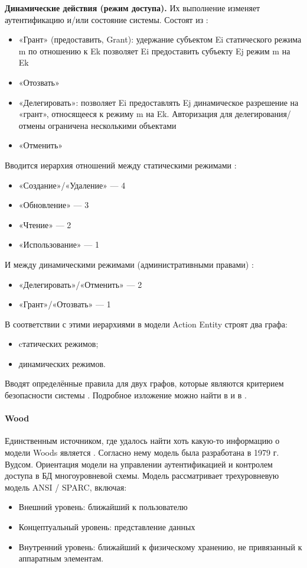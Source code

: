 \textbf{Динамические действия (режим доступа).} Их выполнение изменяет аутентификацию и/или состояние системы.
Состоят из \autocite{SecModels}:
\begin{itemize}
    \item «Грант» (предоставить, Grant): удержание субъектом Ei статического режима m по отношению к Ek
    позволяет Ei предоставить субъекту Ej режим m на Ek
    \item «Отозвать»
    \item «Делегировать»: позволяет Ei предоставлять Ej динамическое разрешение на «грант», относящееся к режиму m
    на Ek. Авторизация для делегирования/отмены ограничена несколькими объектами
    \item «Отменить»
\end{itemize}

Вводится иерархия отношений между статическими режимами \autocite{Jalili}:
\begin{itemize}
    \item «Создание»/«Удаление» --- 4
    \item «Обновление» --- 3
    \item «Чтение» --- 2
    \item «Использование» --- 1
\end{itemize}

И между динамическими режимами (административными правами) \autocite{Jalili}:
\begin{itemize}
    \item «Делегировать»/«Отменить» --- 2
    \item «Грант»/«Отозвать» --- 1
\end{itemize}

В соответствии с этими иерархиями в модели Action Entity строят два графа:
\begin{itemize}
    \item cтатических режимов;
    \item динамических режимов.
\end{itemize}

Вводят определённые правила для двух графов, которые являются критерием безопасности системы \autocite{SecModels}.
Подробное изложение можно найти в \autocite{SecModels} и в \autocite{Jalili}.

\paragraph{Wood}

Единственным источником, где удалось найти хоть какую-то информацию о модели Woods является \autocite{Jalili}.
Согласно нему модель была разработана в 1979 г. Вудсом. Ориентация модели на управлении аутентификацией и контролем
доступа в БД многоуровневой схемы. Модель рассматривает трехуровневую модель ANSI / SPARC, включая:
\begin{itemize}
    \item Внешний уровень: ближайший к пользователю
    \item Концептуальный уровень: представление данных
    \item Внутренний уровень: ближайший к физическому хранению, не привязанный к аппаратным элементам.
\end{itemize}

